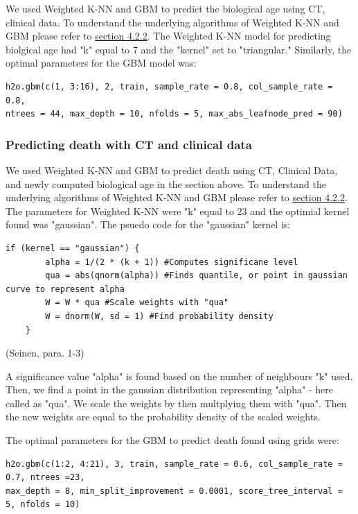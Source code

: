 \documentclass{article}
\begin{document}
We used Weighted K-NN and GBM to predict the biological age using CT, clinical data. To understand the underlying algorithms of Weighted K-NN and GBM please refer to \hyperref[sec:one]{section 4.2.2}. The Weighted K-NN model for predicting biolgical age had "k" equal to 7 and the "kernel" set to "triangular." Similarly, the optimal parameters for the GBM model was: 

\begin{verbatim}
h2o.gbm(c(1, 3:16), 2, train, sample_rate = 0.8, col_sample_rate = 0.8, 
ntrees = 44, max_depth = 10, nfolds = 5, max_abs_leafnode_pred = 90)
\end{verbatim}

\subsubsection{Predicting death with CT and clinical data}

We used Weighted K-NN and GBM to predict death using CT, Clinical Data, and newly computed biological age in the section above. To understand the underlying algorithms of Weighted K-NN and GBM please refer to \hyperref[sec:one]{section 4.2.2}. The parameters for Weighted K-NN were "k" equal to 23 and the optimial kernel found was "gaussian". The psuedo code for the "gaussian" kernel is:

\begin{verbatim}
if (kernel == "gaussian") {
        alpha = 1/(2 * (k + 1)) #Computes significane level
        qua = abs(qnorm(alpha)) #Finds quantile, or point in gaussian curve to represent alpha
        W = W * qua #Scale weights with "qua" 
        W = dnorm(W, sd = 1) #Find probability density
    }
\end{verbatim}

(Seinen, para. 1-3)

A significance value "alpha" is found based on the number of neighbours "k" used. Then, we find a point in the gaussian distribution representing "alpha" - here called as "qua". We scale the weights by then multplying them with "qua". Then the new weights are equal to the probability density of the scaled weights. 

The optimal parameters for the GBM to predict death found using grids were:

\begin{verbatim}
h2o.gbm(c(1:2, 4:21), 3, train, sample_rate = 0.6, col_sample_rate = 0.7, ntrees =23, 
max_depth = 8, min_split_improvement = 0.0001, score_tree_interval = 5, nfolds = 10)
\end{verbatim}
\end{document}
